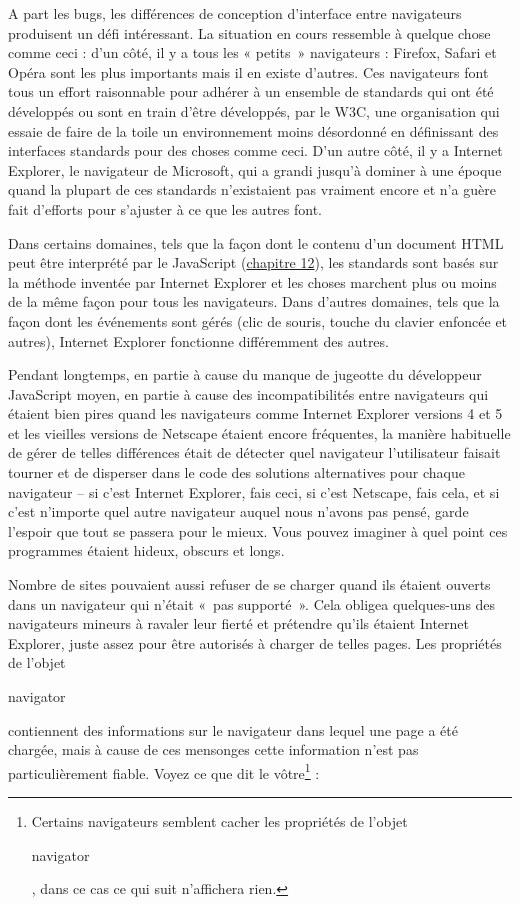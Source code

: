 \documentclass{FramateX}
\renewcommand{\texttt}[1]{\begin{sffamily}{#1}\end{sffamily}}
\begin{document}
\begin{center}\end{center}

A part les bugs, les différences de conception d'interface entre
navigateurs produisent un défi intéressant. La situation en cours
ressemble à quelque chose comme ceci : d'un côté, il y a tous les «
petits~» navigateurs : Firefox, Safari et Opéra sont les plus importants
mais il en existe d'autres. Ces navigateurs font tous un effort
raisonnable pour adhérer à un ensemble de standards qui ont été
développés ou sont en train d'être développés, par le W3C, une
organisation qui essaie de faire de la toile un environnement moins
désordonné en définissant des interfaces standards pour des choses comme
ceci. D'un autre côté, il y a Internet Explorer, le navigateur de
Microsoft, qui a grandi jusqu'à dominer à une époque quand la plupart de
ces standards n'existaient pas vraiment encore et n'a guère fait
d'efforts pour s'ajuster à ce que les autres font.

Dans certains domaines, tels que la façon dont le contenu d'un document
HTML peut être interprété par le JavaScript
(\href{chapter12.html}{chapitre 12}), les standards sont basés sur la
méthode inventée par Internet Explorer et les choses marchent plus ou
moins de la même façon pour tous les navigateurs. Dans d'autres
domaines, tels que la façon dont les événements sont gérés (clic de
souris, touche du clavier enfoncée et autres), Internet Explorer
fonctionne différemment des autres.

Pendant longtemps, en partie à cause du manque de jugeotte du
développeur JavaScript moyen, en partie à cause des incompatibilités
entre navigateurs qui étaient bien pires quand les navigateurs comme
Internet Explorer versions 4 et 5 et les vieilles versions de Netscape
étaient encore fréquentes, la manière habituelle de gérer de telles
différences était de détecter quel navigateur l'utilisateur faisait
tourner et de disperser dans le code des solutions alternatives pour
chaque navigateur -- si c'est Internet Explorer, fais ceci, si c'est
Netscape, fais cela, et si c'est n'importe quel autre navigateur auquel
nous n'avons pas pensé, garde l'espoir que tout se passera pour le
mieux. Vous pouvez imaginer à quel point ces programmes étaient hideux,
obscurs et longs.

Nombre de sites pouvaient aussi refuser de se charger quand ils étaient
ouverts dans un navigateur qui n'était «~pas supporté~». Cela obligea
quelques-uns des navigateurs mineurs à ravaler leur fierté et prétendre
qu'ils étaient Internet Explorer, juste assez pour être autorisés à
charger de telles pages. Les propriétés de l'objet \texttt{navigator}
contiennent des informations sur le navigateur dans lequel une page a
été chargée, mais à cause de ces mensonges cette information n'est pas
particulièrement fiable. Voyez ce que dit le vôtre\footnote{Certains navigateurs semblent cacher les propriétés de l'objet \texttt{navigator}, dans ce cas ce qui suit n'affichera rien.} :
\end{document}
